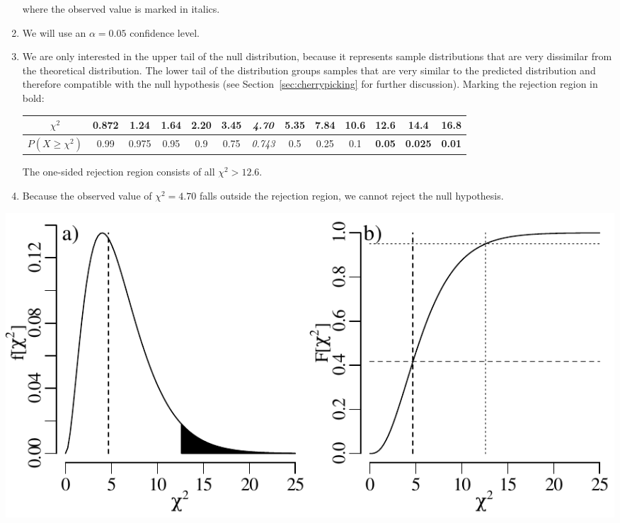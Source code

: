 \begin{enumerate}
  \noindent where the observed value is marked in italics.
  
\item We will use an $\alpha = 0.05$ confidence level.

\item We are only interested in the upper tail of the null
  distribution, because it represents sample distributions that are
  very dissimilar from the theoretical distribution. The lower tail of
  the distribution groups samples that are very similar to the
  predicted distribution and therefore compatible with the null
  hypothesis (see Section~\ref{sec:cherrypicking} for further
  discussion). Marking the rejection region in bold:
  
  \begin{center}
    \begin{tabular}{c|c@{\gap}c@{\gap}c@{\gap}c@{\gap}
        c@{\gap}c@{\gap}c@{\gap}c@{\gap}c@{\gap}c@{\gap}c@{\gap}c}
      $\chi^2$ & 0.872 & 1.24 & 1.64 & 2.20 & 3.45 & \textit{4.70} &
      5.35 & 7.84 & 10.6 & \textbf{12.6} &
      \textbf{14.4} & \textbf{16.8} \\ \hline
      $P(X\geq{\chi^2})$ & 0.99 & 0.975 & 0.95 & 0.9 & 0.75 &
      \textit{0.743} & 0.5 & 0.25 & 0.1 & \textbf{0.05} &
      \textbf{0.025} & \textbf{0.01}
    \end{tabular}
  \end{center}

  The one-sided rejection region consists of all $\chi^2>{12.6}$. 

\item Because the observed value of $\chi^2=4.70$ falls outside the
  rejection region, we cannot reject the null hypothesis.

\end{enumerate}

\noindent\begin{minipage}[t][][b]{.6\textwidth}
  \includegraphics[]{../figures/chi2.pdf}\medskip
\end{minipage}
\begin{minipage}[t][][t]{.4\textwidth}
  \label{fig:chi2}
\end{minipage}

